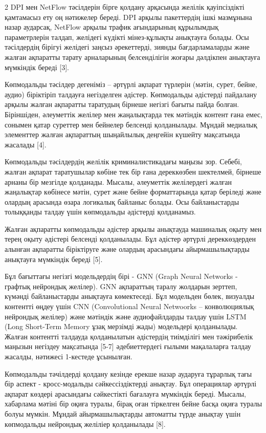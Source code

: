 \begin{multicols}{2}
DPI мен NetFlow тәсілдерін бірге қолдану арқасында желілік қауіпсіздікті
қамтамасыз ету оң нәтижелер береді. DPI арқылы пакеттердің ішкі
мазмұнына назар аударсақ, NetFlow арқылы трафик ағындарының құрылымдық
параметрлерін талдап, желідегі күдікті мінез-құлықты анықтауға болады.
Осы тәсілдердің бірігуі желідегі заңсыз әрекеттерді, зиянды
бағдарламаларды және жалған ақпаратты тарату арналарының белсенділігін
жоғары дәлдікпен анықтауға мүмкіндік береді {[}3{]}.

Көпмодальды тәсілдер дегеніміз -- әртүрлі ақпарат түрлерін (мәтін,
сурет, бейне, аудио) біріктіріп талдауға негізделген әдістер.
Көпмодальды әдістерді пайдалану арқылы жалған ақпаратты таратудың
бірнеше негізгі бағыты пайда болған. Біріншіден, әлеуметтік желілер мен
жаңалықтарда тек мәтіндік контент ғана емес, сонымен қатар суреттер мен
бейнелер белсенді қолданылады. Мұндай медиалық элементтер жалған
ақпараттың шыңайлылық деңгейін күшейту мақсатында жасалады {[}4{]}.

Көпмодальды тәсілдердің желілік криминалистикадағы маңызы зор. Себебі,
жалған ақпарат таратушылар көбіне тек бір ғана дереккөзбен шектелмей,
бірнеше арнаны бір мезгілде қолданады. Мысалы, әлеуметтік желілердегі
жалған жаңалықтар көбінесе мәтін, сурет және бейне форматтарында қатар
беріледі және олардың арасында өзара логикалық байланыс болады. Осы
байланыстарды толыққанды талдау үшін көпмодальды әдістерді қолданамыз.

Жалған ақпаратты көпмодальды әдістер арқылы анықтауда машиналық оқыту
мен терең оқыту әдістері белсенді қолданылады. Бұл әдістер әртүрлі
дереккөздерден алынған ақпаратты біріктіруге және олардың арасындағы
айырмашылықтарды анықтауға мүмкіндік береді {[}5{]}.

Бұл бағыттағы негізгі модельдердің бірі - GNN (Graph Neural Networks -
графтық нейрондық желілер). GNN ақпараттың таралу жолдарын зерттеп,
күмәнді байланыстарды анықтауға көмектеседі. Бұл модельден бөлек,
визуалды контентті өңдеу үшін CNN (Convolutional Neural Netwoorks --
конволюциялық нейрондық желілер) және мәтіндік және аудиофайлдарды
талдау үшін LSTM (Long Short-Term Memory ұзақ мерзімді жады) модельдері
қолданылады. Жалған контентті талдауда қолданылатын әдістердің
тиімділігі мен тәжірибелік маңызын негіздеу мақсатында {[}5-7{]}
әдебиеттердегі ғылыми мақалаларға талдау жасалды, нәтижесі 1-кестеде
ұсынылған.

Көпмодальды тәчілдерді қолдану кезінде ерекше назар аударуға тұрарлық
тағы бір аспект - кросс-модальды сәйкессіздіктерді анықтау. Бұл
операциялар әртүрлі ақпарат көздері арасындағы сәйкестікті бағалауға
мүмкіндік береді. Мысалы, хабарлама мәтіні бір оқиға туралы, бірақ оған
тіркелген бейне басқа оқиға туралы болуы мүмкін. Мұндай айырмашылықтарды
автоматты түрде анықтау үшін көпмодальды нейрондық желіліер қолданылады
{[}8{]}.
\end{multicols}

